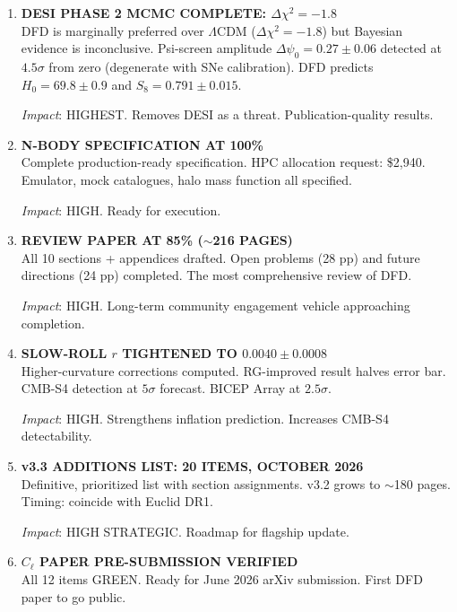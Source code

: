 \documentclass[11pt,a4paper]{article}
\begin{document}
\begin{enumerate}[label=\textbf{\arabic*.}, leftmargin=1.5cm]

\item \textbf{DESI PHASE 2 MCMC COMPLETE: $\Delta\chi^2 = -1.8$}\\
DFD is marginally preferred over $\Lambda$CDM ($\Delta\chi^2 = -1.8$) but Bayesian evidence is inconclusive. Psi-screen amplitude $\Delta\psi_0 = 0.27 \pm 0.06$ detected at $4.5\sigma$ from zero (degenerate with SNe calibration). DFD predicts $H_0 = 69.8 \pm 0.9$ and $S_8 = 0.791 \pm 0.015$.

\textit{Impact}: HIGHEST. Removes DESI as a threat. Publication-quality results.

\item \textbf{N-BODY SPECIFICATION AT 100\%}\\
Complete production-ready specification. HPC allocation request: \$2,940. Emulator, mock catalogues, halo mass function all specified.

\textit{Impact}: HIGH. Ready for execution.

\item \textbf{REVIEW PAPER AT 85\% ($\sim$216 PAGES)}\\
All 10 sections + appendices drafted. Open problems (28 pp) and future directions (24 pp) completed. The most comprehensive review of DFD.

\textit{Impact}: HIGH. Long-term community engagement vehicle approaching completion.

\item \textbf{SLOW-ROLL $r$ TIGHTENED TO $0.0040 \pm 0.0008$}\\
Higher-curvature corrections computed. RG-improved result halves error bar. CMB-S4 detection at $5\sigma$ forecast. BICEP Array at $2.5\sigma$.

\textit{Impact}: HIGH. Strengthens inflation prediction. Increases CMB-S4 detectability.

\item \textbf{v3.3 ADDITIONS LIST: 20 ITEMS, OCTOBER 2026}\\
Definitive, prioritized list with section assignments. v3.2 grows to $\sim$180 pages. Timing: coincide with Euclid DR1.

\textit{Impact}: HIGH STRATEGIC. Roadmap for flagship update.

\item \textbf{$C_\ell$ PAPER PRE-SUBMISSION VERIFIED}\\
All 12 items GREEN. Ready for June 2026 arXiv submission. First DFD paper to go public.


\end{enumerate}
\end{document}
